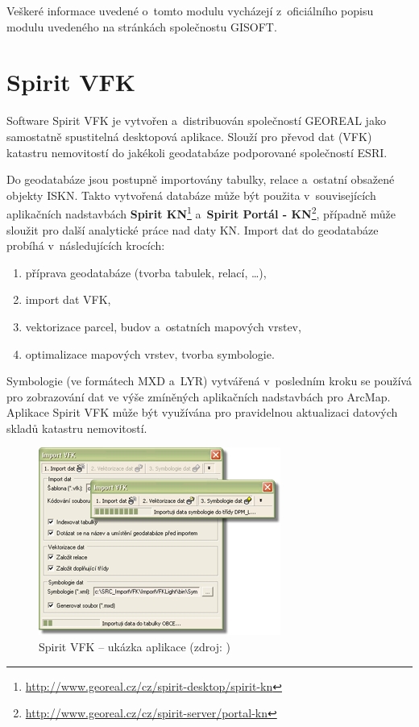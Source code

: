 \documentclass[a4paper,12pt,oneside]{book}
\begin{document}
Veškeré informace uvedené o~tomto modulu vycházejí z~oficiálního
popisu modulu uvedeného na stránkách společnostu
GISOFT. \cite{gisoft_modul}

\newpage
\section{Spirit VFK}
Software Spirit VFK je vytvořen a~distribuován společností GEOREAL
jako samostatně spustitelná desktopová aplikace. Slouží pro převod dat
(VFK) katastru nemovitostí do jakékoli geodatabáze podporované
společností ESRI.

Do geodatabáze jsou postupně importovány tabulky, relace a~ostatní
obsažené objekty ISKN. Takto vytvořená databáze může být použita
v~souvisejících aplikačních nadstavbách \textbf{Spirit
  KN}\footnote{\url{http://www.georeal.cz/cz/spirit-desktop/spirit-kn}}
a~\textbf{Spirit Portál -
  KN}\footnote{\url{http://www.georeal.cz/cz/spirit-server/portal-kn}},
případně může sloužit pro další analytické práce nad daty KN. Import
dat do geodatabáze probíhá v~následujících krocích:

\begin{enumerate}
 \item příprava geodatabáze (tvorba tabulek, relací, \dots),
 \item import dat VFK,
 \item vektorizace parcel, budov a~ostatních mapových vrstev,
 \item optimalizace mapových vrstev, tvorba symbologie.
\end{enumerate}

Symbologie (ve formátech MXD a~LYR) vytvářená v~posledním kroku se
používá pro zobrazování dat ve výše zmíněných aplikačních nadstavbách
pro ArcMap. Aplikace Spirit VFK může být využívána pro pravidelnou
aktualizaci datových skladů katastru nemovitostí.

\begin{figure}[htb]
\centering
\includegraphics[scale=0.7]{images/spirit_vfk.png}
\caption[Spirit VFK -- ukázka aplikace]{Spirit VFK -- ukázka aplikace (zdroj: \cite{spirit_vfk})}
\end{figure}
\end{document}
